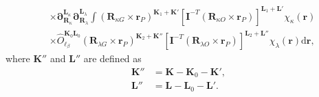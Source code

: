 \documentclass[a4paper,11pt,twoside,openright]{book}
\begin{document}
\begin{align}
  &\times\boldsymbol{\partial}_{\boldsymbol{R}_{\kappa}}^{\boldsymbol{L}_{\kappa}}%
    \boldsymbol{\partial}_{\boldsymbol{R}_{\lambda}}^{\boldsymbol{L}_{\lambda}}%
    \int(\boldsymbol{R}_{\kappa G}\times\boldsymbol{r}_{P})^{\boldsymbol{K}_{1}+\boldsymbol{K}'}%
    \left[\mathbf{I}^{-T}(\boldsymbol{R}_{\kappa O}\times\boldsymbol{r}_{P})\right]^{\boldsymbol{L}_{1}+\boldsymbol{L}'}%
    \chi_{\kappa}(\boldsymbol{r})\nonumber\\
  &\times\hat{O}_{\ell_{\beta}}^{\boldsymbol{K}_{0}\boldsymbol{L}_{0}}%
    (\boldsymbol{R}_{\lambda G}\times\boldsymbol{r}_{P})^{\boldsymbol{K}_{2}+\boldsymbol{K}''}%
    \left[\mathbf{I}^{-T}(\boldsymbol{R}_{\lambda O}\times\boldsymbol{r}_{P})\right]^{\boldsymbol{L}_{2}+\boldsymbol{L}''}%
    \chi_{\lambda}(\boldsymbol{r})\mathrm{d}\boldsymbol{r},\nonumber
\end{align}
where $\boldsymbol{K}''$ and $\boldsymbol{L}''$ are defined as
\begin{align}
  \boldsymbol{K}''&=\boldsymbol{K}-\boldsymbol{K}_{0}-\boldsymbol{K}',\\
  \boldsymbol{L}''&=\boldsymbol{L}-\boldsymbol{L}_{0}-\boldsymbol{L}'.
\end{align}
\end{document}
